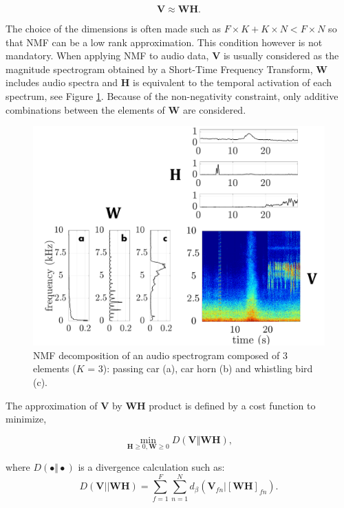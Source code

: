 \documentclass[review,5p,twocolumn,sort&compress,times]{elsarticle}
\begin{document}
\begin{equation}\label{eq:nmf}
\mathbf{V} \approx \mathbf{WH}.
\end{equation}

The choice of the dimensions is often made such as $F\times K + K \times N < F \times N$ so that NMF can be a low rank approximation. This condition however is not mandatory. When  applying NMF to audio data, $\mathbf{V}$ is usually considered as the magnitude spectrogram obtained by a Short-Time Frequency Transform, $\mathbf{W}$ includes audio spectra and $\mathbf{H}$ is equivalent to the temporal activation of each spectrum, see Figure \ref{fig:exampleNMF}. Because of the non-negativity constraint, only additive combinations between the elements of $\mathbf{W}$ are considered. %

\begin{figure}[t]
\includegraphics[width=.9\linewidth]{./figures/schema_introduction_nmf.pdf}
\caption{NMF decomposition of an audio spectrogram composed of 3 elements ($K$ = 3): passing car (a), car horn (b) and whistling bird (c).}
\label{fig:exampleNMF}
\end{figure}

The approximation of $\mathbf{V}$ by $\mathbf{WH}$ product is defined by a cost function to minimize,

\begin{equation}\label{eq:min-D-WH}
\underset{\mathbf{H} \geq 0, \mathbf{W} \geq 0}{\min} D\left(\mathbf{V} \Vert \mathbf{WH}\right),
\end{equation}

where $D(\bullet \Vert \bullet)$ is a divergence calculation such as:
\begin{equation}
D\left(\textbf{V} \vert\vert \mathbf{WH} \right) = \sum_{f = 1}^{F} \sum_{n = 1}^{N} d_{\beta}
\left(\textbf{V}_{fn} \vert \left[ \textbf{WH} \right]_{fn} \right).
\end{equation}
\end{document}
